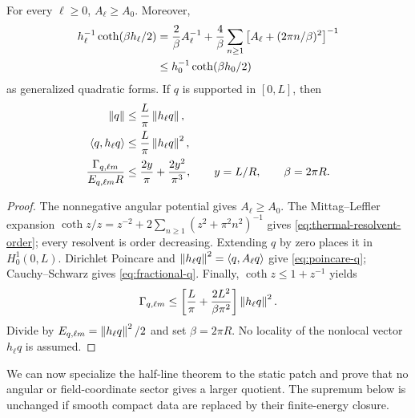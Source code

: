 \begin{lemma}
\label{lem:angular-domination}
For every $\ell\geq0$, $A_\ell\geq A_0$.  Moreover,
\begin{align}
 h_\ell^{-1}\coth(\beta h_\ell/2)
 &=\frac2\beta A_\ell^{-1}
 +\frac4\beta\sum_{n\geq1}
 \left[A_\ell+(2\pi n/\beta)^2\right]^{-1}
 \notag\\
 &\leq h_0^{-1}\coth(\beta h_0/2)
 \label{eq:thermal-resolvent-order}
\end{align}
as generalized quadratic forms.  If $q$ is supported in $[0,L]$, then
\begin{align}
 \left\lVert q\right\rVert&\leq\frac{L}{\pi}\left\lVert h_\ell q\right\rVert,
 \label{eq:poincare-q}\\
 \left\langle q,h_\ell q\right\rangle
 &\leq\frac{L}{\pi}\left\lVert h_\ell q\right\rVert^2,
 \label{eq:fractional-q}\\
 \frac{\Gamma_{q,\ell m}}{E_{q,\ell m}R}
 &\leq\frac{2y}{\pi}+\frac{2y^2}{\pi^3},
 \qquad y=L/R,\qquad \beta=2\pi R.
 \label{eq:coordinate-sector-bound}
\end{align}
\end{lemma}

\begin{proof}
The nonnegative angular potential gives $A_\ell\geq A_0$.  The
Mittag--Leffler expansion $\coth z/z=z^{-2}+2\sum_{n\geq1}
(z^2+\pi^2n^2)^{-1}$ gives \cref{eq:thermal-resolvent-order}; every resolvent
is order decreasing.  Extending $q$ by zero places it in $H_0^1(0,L)$.
Dirichlet Poincare and $\left\lVert h_\ell q\right\rVert^2=\left\langle q,A_\ell q\right\rangle$ give
\cref{eq:poincare-q}; Cauchy--Schwarz gives \cref{eq:fractional-q}.  Finally,
$\coth z\leq1+z^{-1}$ yields
\begin{equation}
 \Gamma_{q,\ell m}
 \leq\left[\frac L\pi+\frac{2L^2}{\beta\pi^2}\right]
 \left\lVert h_\ell q\right\rVert^2.
\end{equation}
Divide by $E_{q,\ell m}=\left\lVert h_\ell q\right\rVert^2/2$ and set $\beta=2\pi R$.
No locality of the nonlocal vector $h_\ell q$ is assumed.
\end{proof}

We can now specialize the half-line theorem to the static patch and prove that
no angular or field-coordinate sector gives a larger quotient.  The supremum
below is unchanged if smooth compact data are replaced by their finite-energy
closure.

